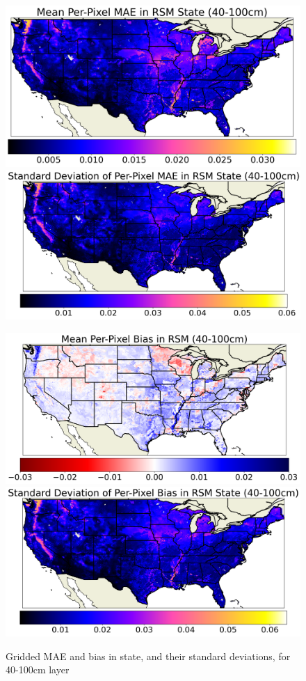 \begin{figure}[hp!]
    \centering

    \includegraphics[width=.48\linewidth,draft=false]{figures/grid-eval_lstm-rsm-9_full/eval-grid_full_lstm-rsm-9_rsm-100_spatial-stats_abs-err_state-err-abs-mean.png}
    \includegraphics[width=.48\linewidth,draft=false]{figures/grid-eval_lstm-rsm-9_full/eval-grid_full_lstm-rsm-9_rsm-100_spatial-stats_abs-err_state-err-abs-stdev.png}

    \includegraphics[width=.48\linewidth,draft=false]{figures/grid-eval_lstm-rsm-9_full/eval-grid_full_lstm-rsm-9_rsm-100_spatial-stats_bias_state-err-bias-mean.png}
    \includegraphics[width=.48\linewidth,draft=false]{figures/grid-eval_lstm-rsm-9_full/eval-grid_full_lstm-rsm-9_rsm-100_spatial-stats_bias_state-err-bias-stdev.png}

    \caption{Gridded MAE and bias in state, and their standard deviations, for 40-100cm layer}
    \label{acclstm-rsm-9-grid-rsm-100}
\end{figure}

